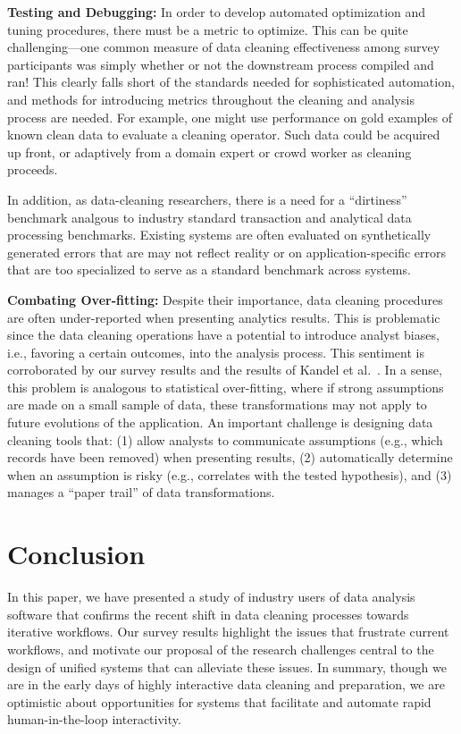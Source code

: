 \vspace{0.5em}
\noindent\textbf{Testing and Debugging:} In order to develop automated optimization and tuning procedures, there must be a metric to optimize.  This can be quite challenging---one common measure of data cleaning effectiveness among survey participants was simply whether or not the downstream process compiled and ran!
This clearly falls short of the standards needed for sophisticated automation, and methods for introducing metrics throughout the cleaning and analysis process are needed.
For example, one might use performance on gold examples of known clean data to evaluate a cleaning operator.
Such data could be acquired up front, or adaptively from a domain expert or crowd worker as cleaning proceeds.

In addition, as data-cleaning researchers, there is a need for a ``dirtiness'' benchmark analgous to industry standard transaction and analytical data processing benchmarks.
Existing systems are often evaluated on synthetically generated errors that are may not reflect reality or on application-specific errors that are too specialized to serve as a standard benchmark across systems.

\vspace{0.5em}
\noindent\textbf{Combating Over-fitting:}
Despite their importance, data cleaning procedures are often under-reported
when presenting analytics results. This is problematic since the data
cleaning operations have a potential to introduce analyst biases,
i.e., favoring a certain outcomes, into the analysis process.
This sentiment is corroborated by our survey results and the results of Kandel et al.~\cite{kandel2012}.
In a sense, this problem is analogous to statistical over-fitting, where if strong assumptions are made on a small sample of data, these transformations may not apply to future evolutions of the application.
An important challenge is designing data cleaning tools that: (1) allow analysts to communicate assumptions (e.g., which records have been removed) when presenting results, (2) automatically determine when an assumption is risky (e.g., correlates with the tested hypothesis), and (3) manages a ``paper trail'' of data transformations.


\section{Conclusion}
In this paper, we have presented a study of industry users of data analysis software that confirms the recent shift in data cleaning processes towards iterative workflows.
Our survey results highlight the issues that frustrate current workflows, and motivate our proposal of the research challenges central to the design of unified systems that can alleviate these issues.
In summary, though we are in the early days of highly interactive data cleaning and preparation, we are optimistic about opportunities for systems that facilitate and automate rapid human-in-the-loop interactivity.


